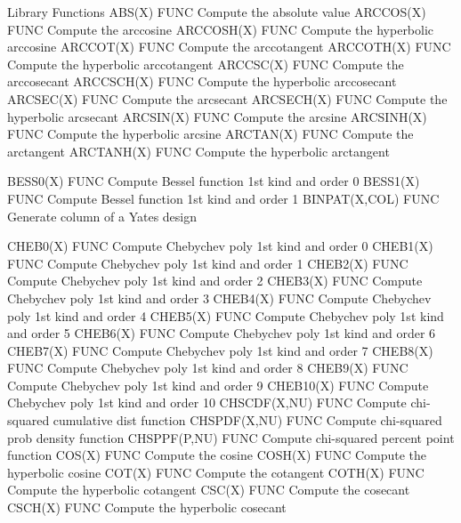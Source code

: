 Library Functions
ABS(X)                      FUNC  Compute the absolute value
ARCCOS(X)                   FUNC  Compute the arccosine
ARCCOSH(X)                  FUNC  Compute the hyperbolic arccosine
ARCCOT(X)                   FUNC  Compute the arccotangent
ARCCOTH(X)                  FUNC  Compute the hyperbolic arccotangent
ARCCSC(X)                   FUNC  Compute the arccosecant
ARCCSCH(X)                  FUNC  Compute the hyperbolic arccosecant
ARCSEC(X)                   FUNC  Compute the arcsecant
ARCSECH(X)                  FUNC  Compute the hyperbolic arcsecant
ARCSIN(X)                   FUNC  Compute the arcsine
ARCSINH(X)                  FUNC  Compute the hyperbolic arcsine
ARCTAN(X)                   FUNC  Compute the arctangent
ARCTANH(X)                  FUNC  Compute the hyperbolic arctangent

BESS0(X)                    FUNC  Compute Bessel function 1st kind and order 0
BESS1(X)                    FUNC  Compute Bessel function 1st kind and order 1
BINPAT(X,COL)               FUNC  Generate column of a Yates design

CHEB0(X)                    FUNC  Compute Chebychev poly 1st kind and order 0
CHEB1(X)                    FUNC  Compute Chebychev poly 1st kind and order 1
CHEB2(X)                    FUNC  Compute Chebychev poly 1st kind and order 2
CHEB3(X)                    FUNC  Compute Chebychev poly 1st kind and order 3
CHEB4(X)                    FUNC  Compute Chebychev poly 1st kind and order 4
CHEB5(X)                    FUNC  Compute Chebychev poly 1st kind and order 5
CHEB6(X)                    FUNC  Compute Chebychev poly 1st kind and order 6
CHEB7(X)                    FUNC  Compute Chebychev poly 1st kind and order 7
CHEB8(X)                    FUNC  Compute Chebychev poly 1st kind and order 8
CHEB9(X)                    FUNC  Compute Chebychev poly 1st kind and order 9
CHEB10(X)                   FUNC  Compute Chebychev poly 1st kind and order 10
CHSCDF(X,NU)                FUNC  Compute chi-squared cumulative dist function
CHSPDF(X,NU)                FUNC  Compute chi-squared prob density function
CHSPPF(P,NU)                FUNC  Compute chi-squared percent point function
COS(X)                      FUNC  Compute the cosine
COSH(X)                     FUNC  Compute the hyperbolic cosine
COT(X)                      FUNC  Compute the cotangent
COTH(X)                     FUNC  Compute the hyperbolic cotangent
CSC(X)                      FUNC  Compute the cosecant
CSCH(X)                     FUNC  Compute the hyperbolic cosecant

